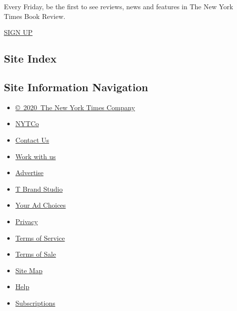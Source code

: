 Every Friday, be the first to see reviews, news and features in The New
York Times Book Review.

\href{/newsletters/signup/BK}{SIGN UP}

\hypertarget{site-index}{%
\subsection{Site Index}\label{site-index}}

\hypertarget{site-information-navigation}{%
\subsection{Site Information
Navigation}\label{site-information-navigation}}

\begin{itemize}
\tightlist
\item
  \href{https://help.nytimes.com/hc/en-us/articles/115014792127-Copyright-notice}{©~2020~The
  New York Times Company}
\end{itemize}

\begin{itemize}
\tightlist
\item
  \href{https://www.nytco.com/}{NYTCo}
\item
  \href{https://help.nytimes.com/hc/en-us/articles/115015385887-Contact-Us}{Contact
  Us}
\item
  \href{https://www.nytco.com/careers/}{Work with us}
\item
  \href{https://nytmediakit.com/}{Advertise}
\item
  \href{http://www.tbrandstudio.com/}{T Brand Studio}
\item
  \href{https://www.nytimes.com/privacy/cookie-policy\#how-do-i-manage-trackers}{Your
  Ad Choices}
\item
  \href{https://www.nytimes.com/privacy}{Privacy}
\item
  \href{https://help.nytimes.com/hc/en-us/articles/115014893428-Terms-of-service}{Terms
  of Service}
\item
  \href{https://help.nytimes.com/hc/en-us/articles/115014893968-Terms-of-sale}{Terms
  of Sale}
\item
  \href{https://spiderbites.nytimes.com}{Site Map}
\item
  \href{https://help.nytimes.com/hc/en-us}{Help}
\item
  \href{https://www.nytimes.com/subscription?campaignId=37WXW}{Subscriptions}
\end{itemize}

